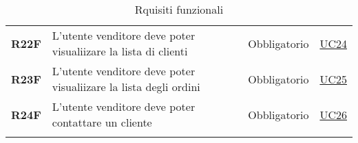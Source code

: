 \begin{center}
\begin{longtable}[!h]{p{50px} p{210px} p{80px} p{50px}}
        \textbf{R22F}                                 & L'utente venditore deve poter visualiizare la lista di clienti                                   & Obbligatorio             & \hyperref[sec:UC24]{UC24}     \\
        \textbf{R23F}                                 & L'utente venditore deve poter visualiizare la lista degli ordini                                 & Obbligatorio             & \hyperref[sec:UC25]{UC25}     \\
        \textbf{R24F}                                 & L'utente venditore deve poter contattare un cliente                                              & Obbligatorio             & \hyperref[sec:UC26]{UC26}     \\
        \rowcolor{white}\caption{Rquisiti funzionali}
    \end{longtable}
\end{center}

